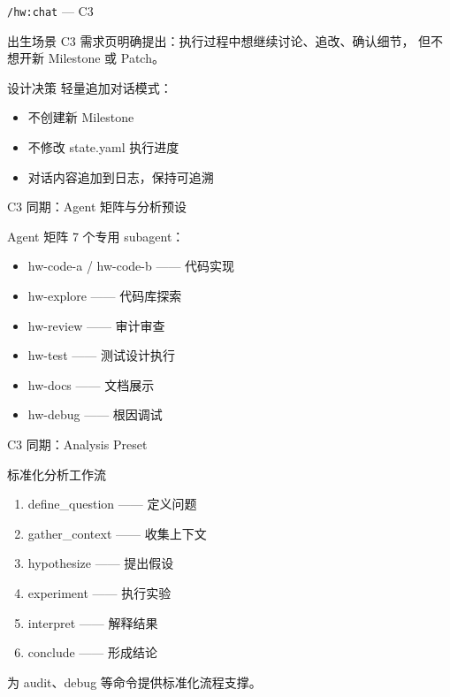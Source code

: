 \documentclass[theme=workflow,aspectratio=169,fontset=tech]{Hypo-Slide}
\begin{document}
\begin{frame}{\texttt{/hw:chat} — C3}
  \begin{block}{出生场景}
    C3 需求页明确提出：执行过程中想继续讨论、追改、确认细节，
    但不想开新 Milestone 或 Patch。
  \end{block}
  \begin{block}{设计决策}
    轻量追加对话模式：
    \begin{itemize}
      \item 不创建新 Milestone
      \item 不修改 state.yaml 执行进度
      \item 对话内容追加到日志，保持可追溯
    \end{itemize}
  \end{block}
\end{frame}

\begin{frame}{C3 同期：Agent 矩阵与分析预设}
  \begin{block}{Agent 矩阵}
    7 个专用 subagent：
    \begin{itemize}
      \item hw-code-a / hw-code-b —— 代码实现
      \item hw-explore —— 代码库探索
      \item hw-review —— 审计审查
      \item hw-test —— 测试设计执行
      \item hw-docs —— 文档展示
      \item hw-debug —— 根因调试
    \end{itemize}
  \end{block}
\end{frame}

\begin{frame}{C3 同期：Analysis Preset}
  \begin{block}{标准化分析工作流}
    \begin{enumerate}
      \item define\_question —— 定义问题
      \item gather\_context —— 收集上下文
      \item hypothesize —— 提出假设
      \item experiment —— 执行实验
      \item interpret —— 解释结果
      \item conclude —— 形成结论
    \end{enumerate}
    为 audit、debug 等命令提供标准化流程支撑。
  \end{block}
\end{frame}
\end{document}
